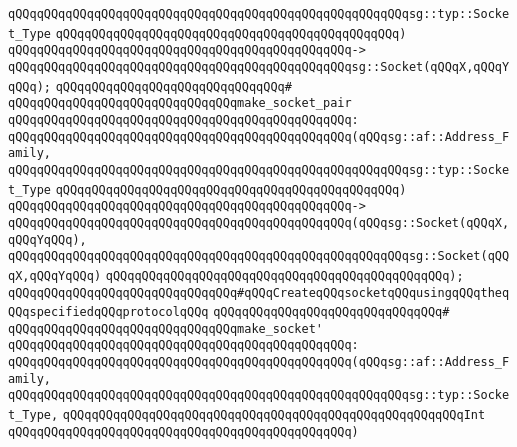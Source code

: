 \verb|qQQqqQQqqQQqqQQqqQQqqQQqqQQqqQQqqQQqqQQqqQQqqQQqqQQqqQQqsg::typ::Socket_Type|\newline
\verb|qQQqqQQqqQQqqQQqqQQqqQQqqQQqqQQqqQQqqQQqqQQqqQQq)|\newline
\verb|qQQqqQQqqQQqqQQqqQQqqQQqqQQqqQQqqQQqqQQqqQQqqQQq->|\newline
\verb|qQQqqQQqqQQqqQQqqQQqqQQqqQQqqQQqqQQqqQQqqQQqqQQqsg::Socket(qQQqX,qQQqYqQQq);|\newline
\verb|qQQqqQQqqQQqqQQqqQQqqQQqqQQqqQQq#|\newline
\verb|qQQqqQQqqQQqqQQqqQQqqQQqqQQqqQQqmake_socket_pair|\newline
\verb|qQQqqQQqqQQqqQQqqQQqqQQqqQQqqQQqqQQqqQQqqQQqqQQq:|\newline
\verb|qQQqqQQqqQQqqQQqqQQqqQQqqQQqqQQqqQQqqQQqqQQqqQQq(qQQqsg::af::Address_Family,|\newline
\verb|qQQqqQQqqQQqqQQqqQQqqQQqqQQqqQQqqQQqqQQqqQQqqQQqqQQqqQQqsg::typ::Socket_Type|\newline
\verb|qQQqqQQqqQQqqQQqqQQqqQQqqQQqqQQqqQQqqQQqqQQqqQQq)|\newline
\verb|qQQqqQQqqQQqqQQqqQQqqQQqqQQqqQQqqQQqqQQqqQQqqQQq->|\newline
\verb|qQQqqQQqqQQqqQQqqQQqqQQqqQQqqQQqqQQqqQQqqQQqqQQq(qQQqsg::Socket(qQQqX,qQQqYqQQq),|\newline
\verb|qQQqqQQqqQQqqQQqqQQqqQQqqQQqqQQqqQQqqQQqqQQqqQQqqQQqqQQqsg::Socket(qQQqX,qQQqYqQQq)|\newline
\verb|qQQqqQQqqQQqqQQqqQQqqQQqqQQqqQQqqQQqqQQqqQQqqQQq);|\newline
\newline
\verb|qQQqqQQqqQQqqQQqqQQqqQQqqQQqqQQq#qQQqCreateqQQqsocketqQQqusingqQQqtheqQQqspecifiedqQQqprotocolqQQq|\newline
\verb|qQQqqQQqqQQqqQQqqQQqqQQqqQQqqQQq#|\newline
\verb|qQQqqQQqqQQqqQQqqQQqqQQqqQQqqQQqmake_socket'|\newline
\verb|qQQqqQQqqQQqqQQqqQQqqQQqqQQqqQQqqQQqqQQqqQQqqQQq:|\newline
\verb|qQQqqQQqqQQqqQQqqQQqqQQqqQQqqQQqqQQqqQQqqQQqqQQq(qQQqsg::af::Address_Family,|\newline
\verb|qQQqqQQqqQQqqQQqqQQqqQQqqQQqqQQqqQQqqQQqqQQqqQQqqQQqqQQqsg::typ::Socket_Type,|\newline
\verb|qQQqqQQqqQQqqQQqqQQqqQQqqQQqqQQqqQQqqQQqqQQqqQQqqQQqqQQqInt|\newline
\verb|qQQqqQQqqQQqqQQqqQQqqQQqqQQqqQQqqQQqqQQqqQQqqQQq)|\newline
